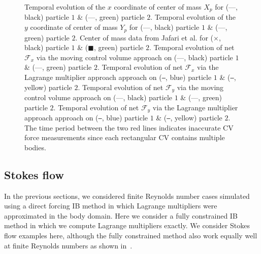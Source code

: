 \documentclass[review]{elsarticle}
\newcommand{\REVIEW}[1]{{#1}}
\begin{document}
{\begin{figure}[H]
  \centering
  \caption{ \REVIEW{
  Temporal evolution of the $x$ coordinate of center of mass $X_p$ for (---, black) particle $1$ \& (---, green) particle $2$.
  \subref{fig_dkt_ycom}
   Temporal evolution of the $y$ coordinate of center of mass $Y_p$ for (---, black) particle $1$ \& (---, green) particle $2$.
   Center of mass data from Jafari et al. \cite{Jafari11} for ($\times$, black) particle $1$ \& ($\blacksquare$, green) particle $2$.
  \subref{fig_dkt_Fx}
   Temporal evolution of net $\mathcal{F}_x$ via the moving control volume approach on (---, black) particle $1$  \& (---, green) 
   particle $2$. Temporal evolution of net $\mathcal{F}_x$ via the Lagrange multiplier approach approach on (\texttt{---}, blue) 
   particle $1$  \& (\texttt{---}, yellow) particle $2$.
   \subref{fig_dkt_Fy}
   Temporal evolution of net $\mathcal{F}_y$ via the moving control volume approach on (---, black) particle $1$  \& (---, green) 
   particle $2$. Temporal evolution of net $\mathcal{F}_y$ via the Lagrange multiplier approach approach on (\texttt{---}, blue) 
   particle $1$  \& (\texttt{---}, yellow) particle $2$. The time period between the two red lines indicates inaccurate 
   CV force measurements since each rectangular CV contains multiple bodies.}
   }
  \label{fig_dkt}
\end{figure}

} %



\subsection {Stokes flow}
In the previous sections, we considered finite Reynolds number cases simulated 
using a direct forcing IB method in which Lagrange multipliers were approximated 
in the body domain. Here we consider a fully constrained IB method in which we 
compute Lagrange multipliers exactly. We consider Stokes flow examples here,
although the fully constrained method also work equally well at finite Reynolds numbers
as shown in~\cite{Kallemov16}.
\end{document}
